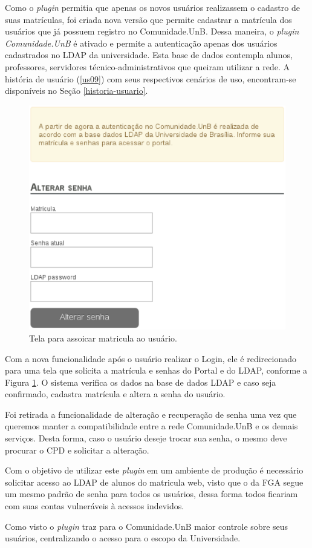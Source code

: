 Como o \textit{plugin} permitia que apenas os novos usuários realizassem o cadastro de suas matrículas, foi criada nova versão que permite cadastrar a matrícula dos usuários que já possuem registro no Comunidade.UnB. Dessa maneira, o \textit{plugin Comunidade.UnB} é ativado e permite a autenticação apenas dos usuários cadastrados no LDAP da universidade. Esta base de dados contempla alunos, professores, servidores técnico-administrativos que queiram utilizar a rede. A história de usuário (\ref{us09}) com seus respectivos cenários de uso, encontram-se disponíveis no Seção \ref{historia-usuario}.

\begin{figure}[h]
    \centering
    \includegraphics[keepaspectratio=true,scale=0.5]
      {figuras/associate-matricula.eps}
    \caption{Tela para assoicar matricula ao usuário.}
    \label{fig:associate-matricula}
\end{figure}

Com a nova funcionalidade após o usuário realizar o Login, ele é redirecionado para uma tela que solicita a matrícula e senhas do Portal e do LDAP, conforme a Figura \ref{fig:associate-matricula}. O sistema verifica os dados na base de dados LDAP e caso seja confirmado, cadastra matrícula e altera a senha do usuário.

Foi retirada a funcionalidade de alteração e recuperação de senha uma vez que queremos manter a compatibilidade entre a rede Comunidade.UnB e os demais serviços. Desta forma, caso o usuário deseje trocar sua senha, o mesmo deve procurar o CPD e solicitar a alteração.

Com o objetivo de utilizar este \textit{plugin} em um ambiente de produção é necessário solicitar acesso ao LDAP de alunos do matricula web, visto que o da FGA segue um mesmo padrão de senha para todos os usuários, dessa forma todos ficariam com suas contas vulneráveis à acessos indevidos.

Como visto o \textit{plugin} traz para o Comunidade.UnB maior controle sobre seus usuários, centralizando o acesso para o escopo da Universidade.

